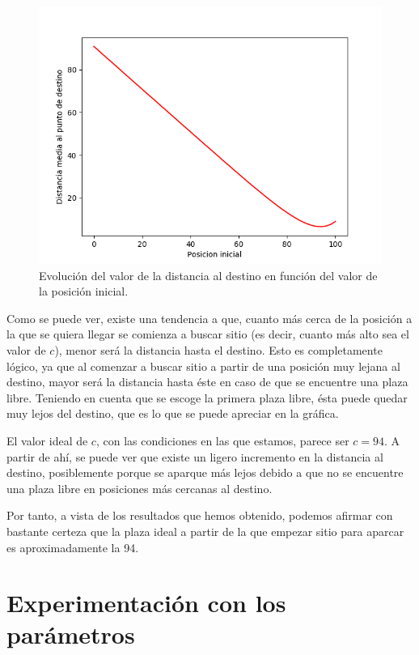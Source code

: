 \documentclass[11pt,a4paper]{report}
\begin{document}
\begin{figure}[H]
\centering
\includegraphics[scale=0.6]{img/c-dist.png}
\caption{Evolución del valor de la distancia al destino en función del valor de la posición inicial.}
\label{aparc-grafica}
\end{figure}

Como se puede ver, existe una tendencia a que, cuanto más cerca de la posición a la que se quiera llegar
se comienza a buscar sitio (es decir, cuanto más alto sea el valor de $c$), menor será la distancia hasta
el destino. Esto es completamente lógico, ya que al comenzar a buscar sitio a partir de una posición
muy lejana al destino, mayor será la distancia hasta éste en caso de que se encuentre una plaza libre. Teniendo
en cuenta que se escoge la primera plaza libre, ésta puede quedar muy lejos del destino, que es lo que se puede
apreciar en la gráfica.

El valor ideal de $c$, con las condiciones en las que estamos, parece ser $c = 94$. A partir de ahí, se puede ver
que existe un ligero incremento en la distancia al destino, posiblemente porque se aparque más lejos debido a que
no se encuentre una plaza libre en posiciones más cercanas al destino.

Por tanto, a vista de los resultados que hemos obtenido, podemos afirmar con bastante certeza que la plaza ideal
a partir de la que empezar sitio para aparcar es aproximadamente la 94.

\section{Experimentación con los parámetros}
\end{document}
